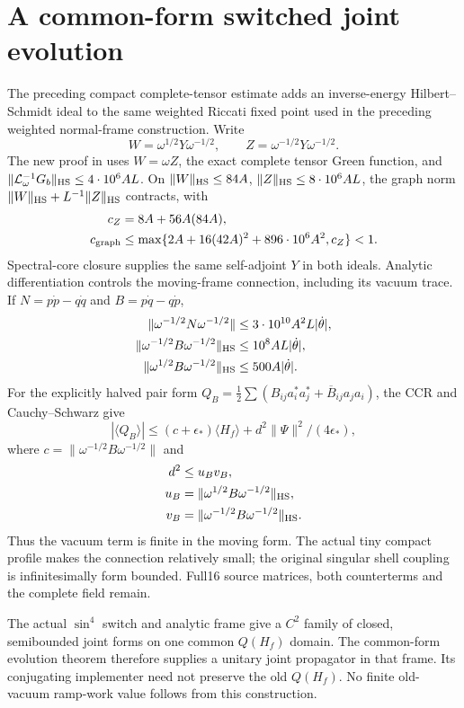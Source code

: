 \section{A common-form switched joint evolution}
\label{sec:preparation7-joint}
The preceding compact complete-tensor estimate adds an inverse-energy
Hilbert--Schmidt ideal to the same weighted Riccati fixed point used in
the preceding weighted normal-frame construction. Write
\[
 W=\omega^{1/2}Y\omega^{-1/2},\qquad
 Z=\omega^{-1/2}Y\omega^{-1/2}.
\]
The new proof in 
uses $W=\omega Z$, the exact complete tensor Green function, and
$\|\mathcal L_\omega^{-1}G_b\|_{\rm HS}\le4\cdot10^6AL$.
On $\|W\|_{\rm HS}\le84A$, $\|Z\|_{\rm HS}\le8\cdot10^6AL$,
the graph norm $\|W\|_{\rm HS}+L^{-1}\|Z\|_{\rm HS}$ contracts, with
\begin{align*}
 c_Z&=8A+56A(84A),\\
 c_{\rm graph}&\le\max\{2A+16(42A)^2+896\cdot10^6A^2,c_Z\}<1.
\end{align*}
Spectral-core closure supplies the same self-adjoint $Y$ in both ideals.
Analytic differentiation controls the moving-frame connection, including
its vacuum trace. If $N=p\dot p-q\dot q$ and $B=p\dot q-q\dot p$,
\begin{align*}
 \|\omega^{-1/2}N\omega^{-1/2}\|
     &\le3\cdot10^{10}A^2L|\dot\theta|,\\
 \|\omega^{-1/2}B\omega^{-1/2}\|_{\rm HS}
     &\le10^8AL|\dot\theta|,\\
 \|\omega^{1/2}B\omega^{-1/2}\|_{\rm HS}
     &\le500A|\dot\theta|.
\end{align*}
For the explicitly halved pair form
$Q_B=\tfrac12\sum(B_{ij}a_i^*a_j^*+\overline B_{ij}a_ja_i)$,
the CCR and Cauchy--Schwarz give
\[
 |\langle Q_B\rangle|\le(c+\epsilon_*)\langle H_f\rangle
                 +d^2\|\Psi\|^2/(4\epsilon_*),
\]
where $c=\|\omega^{-1/2}B\omega^{-1/2}\|$ and
\begin{align*}
 d^2&\le u_B v_B,\\
 u_B&=\|\omega^{1/2}B\omega^{-1/2}\|_{\rm HS},\\
 v_B&=\|\omega^{-1/2}B\omega^{-1/2}\|_{\rm HS}.
\end{align*}
Thus the vacuum term is finite in the moving form. The actual tiny compact
profile makes the connection relatively small; the original singular
shell coupling is infinitesimally form bounded. Full16 source matrices,
both counterterms and the complete field remain.

The actual $\sin^4$ switch and analytic frame give a $C^2$ family of closed,
semibounded joint forms on one common $Q(H_f)$ domain. The common-form
evolution theorem therefore supplies a unitary joint propagator in that
frame. Its conjugating implementer need not preserve the old $Q(H_f)$.
No finite old-vacuum ramp-work value follows from this construction.

